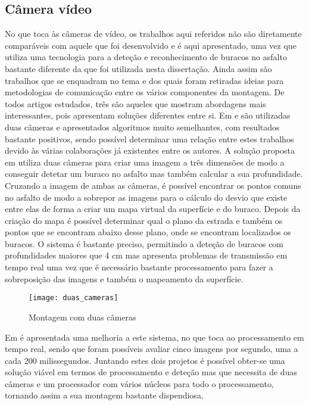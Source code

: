 \subsection{Câmera vídeo}
\label{subsec: camera_video}
No que toca às câmeras de vídeo, os trabalhos aqui referidos não são diretamente comparáveis com aquele que foi desenvolvido e é aqui apresentado, uma vez que utiliza uma tecnologia para a deteção e reconhecimento de buracos no asfalto bastante diferente da que foi utilizada nesta dissertação.
Ainda assim são trabalhos que se enquadram no tema e dos quais foram retiradas ideias para metodologias de comunicação entre os vários componentes da montagem.
De todos artigos estudados, três são aqueles que mostram abordagens mais interessantes, pois apresentam soluções diferentes entre si.
Em \cite{Zhang} e \cite{Chan2014} são utilizadas duas câmeras e apresentados algoritmos muito semelhantes, com resultados bastante positivos, sendo possível determinar uma relação entre estes trabalhos devido às várias colaborações já existentes entre os autores.
A solução proposta em \cite{Zhang} utiliza duas câmeras para criar uma imagem a três dimensões de modo a conseguir detetar um buraco no asfalto mas também calcular a sua profundidade.
Cruzando a imagem de ambas as câmeras, é possível encontrar os pontos comuns no asfalto de modo a sobrepor as imagens para o cálculo do desvio que existe entre elas de forma a criar um mapa virtual da superfície e do buraco.
Depois da criação do mapa é possível determinar qual o plano da estrada e também os pontos que se encontram abaixo desse plano, onde se encontram localizados os buracos.
O sistema é bastante preciso, permitindo a deteção de buracos com profundidades maiores que 4 cm mas apresenta problemas de transmissão em tempo real uma vez que é necessário bastante processamento para fazer a sobreposição das imagens e também o mapeamento da superfície.

\begin{figure}[htbp]
	\centering
	\texttt{[image: duas\_cameras]}
	\caption[Montagem com duas câmeras]{Montagem com duas câmeras \footnotemark}
	\label{fig:montagem_com_duas_cameras}
\end{figure}


Em \cite{Chan2014} é apresentada uma melhoria a este sistema, no que toca ao processamento em tempo real, sendo que foram possíveis avaliar cinco imagens por segundo, uma a cada 200 milissegundos.
Juntando estes dois projetos é possível obter-se uma solução viável em termos de processamento e deteção mas que necessita de duas câmeras e um processador com vários núcleos para todo o processamento, tornando assim a sua montagem bastante dispendiosa.

